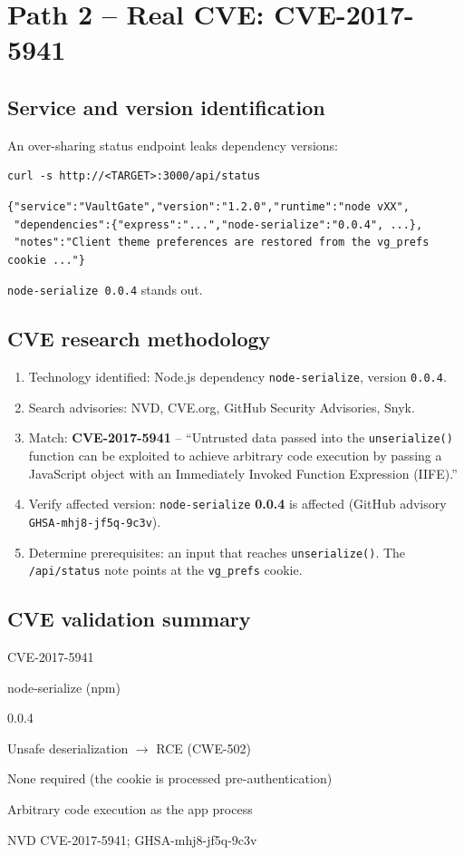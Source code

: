 \documentclass[11pt,a4paper]{article}
\begin{document}
\section{Path 2 -- Real CVE: CVE-2017-5941}
\subsection{Service and version identification}
An over-sharing status endpoint leaks dependency versions:
\begin{lstlisting}[style=bash]
curl -s http://<TARGET>:3000/api/status
\end{lstlisting}
\begin{lstlisting}[style=plain]
{"service":"VaultGate","version":"1.2.0","runtime":"node vXX",
 "dependencies":{"express":"...","node-serialize":"0.0.4", ...},
 "notes":"Client theme preferences are restored from the vg_prefs cookie ..."}
\end{lstlisting}
\texttt{node-serialize 0.0.4} stands out.

\subsection{CVE research methodology}
\begin{enumerate}[leftmargin=1.4cm]
  \item Technology identified: Node.js dependency \texttt{node-serialize},
  version \texttt{0.0.4}.
  \item Search advisories: NVD, CVE.org, GitHub Security Advisories, Snyk.
  \item Match: \textbf{CVE-2017-5941} -- ``Untrusted data passed into the
  \texttt{unserialize()} function can be exploited to achieve arbitrary code
  execution by passing a JavaScript object with an Immediately Invoked Function
  Expression (IIFE).''
  \item Verify affected version: \texttt{node-serialize} \textbf{0.0.4} is
  affected (GitHub advisory \texttt{GHSA-mhj8-jf5q-9c3v}).
  \item Determine prerequisites: an input that reaches \texttt{unserialize()}. The
  \texttt{/api/status} note points at the \texttt{vg\_prefs} cookie.
\end{enumerate}

\subsection{CVE validation summary}
\begin{description}[leftmargin=2.8cm,style=nextline]
  \item[Identifier] CVE-2017-5941
  \item[Product] node-serialize (npm)
  \item[Affected] 0.0.4
  \item[Type] Unsafe deserialization $\rightarrow$ RCE (CWE-502)
  \item[Auth] None required (the cookie is processed pre-authentication)
  \item[Impact] Arbitrary code execution as the app process
  \item[References] NVD CVE-2017-5941; GHSA-mhj8-jf5q-9c3v
\end{description}
\end{document}
